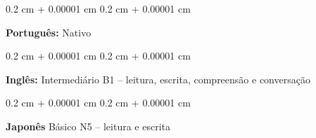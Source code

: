 \documentclass[10pt, letterpaper]{article}
\newenvironment{onecolentry}{
    \begin{adjustwidth}{
        0.2 cm + 0.00001 cm
    }{
        0.2 cm + 0.00001 cm
    }
}{
    \end{adjustwidth}
} %
\begin{document}
        \begin{onecolentry}
            \textbf{Português:} Nativo
        \end{onecolentry}

        \vspace{0.1 cm}
        \begin{onecolentry}
            \textbf{Inglês:} Intermediário B1 – leitura, escrita, compreensão e conversação
        \end{onecolentry}

        \vspace{0.1 cm}
        \begin{onecolentry}
            \textbf{Japonês} Básico N5 – leitura e escrita
        \end{onecolentry}

        
\end{document}
